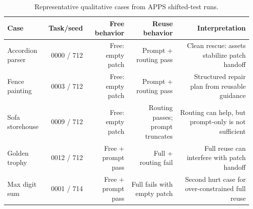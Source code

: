 \begin{table}[t]
\centering
\small
\begin{tabular}{lrrrr}
\toprule
Case & Task/seed & Free behavior & Reuse behavior & Interpretation \\
\midrule
Accordion parser & 0000 / 712 & Free: empty patch & Prompt + routing pass & Clean rescue: assets stabilize patch handoff \\
Fence painting & 0003 / 712 & Free: empty patch & Prompt + routing pass & Structured repair plan from reusable guidance \\
Sofa storehouse & 0009 / 712 & Free: empty patch & Routing passes; prompt truncates & Routing can help, but prompt-only is not sufficient \\
Golden trophy & 0012 / 712 & Free + prompt pass & Full + routing fail & Full reuse can interfere with patch handoff \\
Max digit sum & 0001 / 714 & Free + prompt pass & Full fails with empty patch & Second hurt case for over-constrained full reuse \\
\bottomrule
\end{tabular}
\caption{Representative qualitative cases from APPS shifted-test runs.}
\label{tab:apps-cases}
\end{table}

